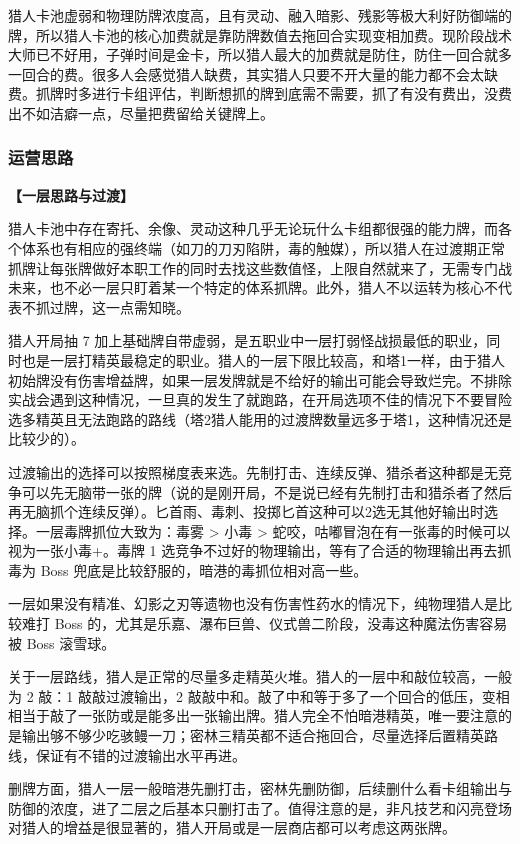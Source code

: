﻿\documentclass[12pt, a4paper]{article}
\begin{document}
猎人卡池虚弱和物理防牌浓度高，且有灵动、融入暗影、残影等极大利好防御端的牌，所以猎人卡池的核心加费就是靠防牌数值去拖回合实现变相加费。现阶段战术大师已不好用，子弹时间是金卡，所以猎人最大的加费就是防住，防住一回合就多一回合的费。很多人会感觉猎人缺费，其实猎人只要不开大量的能力都不会太缺费。抓牌时多进行卡组评估，判断想抓的牌到底需不需要，抓了有没有费出，没费出不如洁癖一点，尽量把费留给关键牌上。

\subsubsection{运营思路}

\textbf{【一层思路与过渡】}

猎人卡池中存在寄托、余像、灵动这种几乎无论玩什么卡组都很强的能力牌，而各个体系也有相应的强终端（如刀的刀刃陷阱，毒的触媒），所以猎人在过渡期正常抓牌让每张牌做好本职工作的同时去找这些数值怪，上限自然就来了，无需专门战未来，也不必一层只盯着某一个特定的体系抓牌。此外，猎人不以运转为核心不代表不抓过牌，这一点需知晓。

猎人开局抽 7 加上基础牌自带虚弱，是五职业中一层打弱怪战损最低的职业，同时也是一层打精英最稳定的职业。猎人的一层下限比较高，和塔1一样，由于猎人初始牌没有伤害增益牌，如果一层发牌就是不给好的输出可能会导致烂完。不排除实战会遇到这种情况，一旦真的发生了就跑路，在开局选项不佳的情况下不要冒险选多精英且无法跑路的路线（塔2猎人能用的过渡牌数量远多于塔1，这种情况还是比较少的）。

过渡输出的选择可以按照梯度表来选。先制打击、连续反弹、猎杀者这种都是无竞争可以先无脑带一张的牌（说的是刚开局，不是说已经有先制打击和猎杀者了然后再无脑抓个连续反弹）。匕首雨、毒刺、投掷匕首这种可以2选无其他好输出时选择。一层毒牌抓位大致为：毒雾 \textgreater{} 小毒 \textgreater{} 蛇咬，咕嘟冒泡在有一张毒的时候可以视为一张小毒+。毒牌 1 选竞争不过好的物理输出，等有了合适的物理输出再去抓毒为 Boss 兜底是比较舒服的，暗港的毒抓位相对高一些。

一层如果没有精准、幻影之刃等遗物也没有伤害性药水的情况下，纯物理猎人是比较难打 Boss 的，尤其是乐嘉、瀑布巨兽、仪式兽二阶段，没毒这种魔法伤害容易被 Boss 滚雪球。

关于一层路线，猎人是正常的尽量多走精英火堆。猎人的一层中和敲位较高，一般为 2 敲：1 敲敲过渡输出，2 敲敲中和。敲了中和等于多了一个回合的低压，变相相当于敲了一张防或是能多出一张输出牌。猎人完全不怕暗港精英，唯一要注意的是输出够不够少吃骇鳗一刀；密林三精英都不适合拖回合，尽量选择后置精英路线，保证有不错的过渡输出水平再进。

删牌方面，猎人一层一般暗港先删打击，密林先删防御，后续删什么看卡组输出与防御的浓度，进了二层之后基本只删打击了。值得注意的是，非凡技艺和闪亮登场对猎人的增益是很显著的，猎人开局或是一层商店都可以考虑这两张牌。
\end{document}
